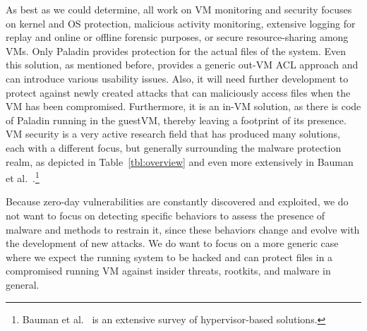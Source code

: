 \par As best as we could determine, all work on \ac{VM} monitoring and security focuses on kernel and \ac{OS} protection, malicious activity monitoring, extensive logging for replay and online or offline forensic purposes, or secure resource-sharing among \ac{VM}s. Only Paladin \cite{baliga2008automated} provides protection for the actual files of the system. Even this solution, as mentioned before, provides a generic out-\ac{VM} \ac{ACL} approach and can introduce various usability issues. Also, it will need further development to protect against newly created attacks that can maliciously access files when the \ac{VM} has been compromised. Furthermore, it is an in-\ac{VM} solution, as there is code of Paladin running in the guest\ac{VM}, thereby leaving a footprint of its presence. \ac{VM} security is a very active research field that has produced many solutions, each with a different focus, but generally surrounding the malware protection realm, as depicted in Table~\ref{tbl:overview} and even more extensively in Bauman et al.~\cite{bauman2015survey}.\footnote{Bauman et al.~\cite{bauman2015survey} is an extensive survey of hypervisor-based solutions.}


\par Because zero-day vulnerabilities are constantly discovered and exploited, we do not want to focus on detecting specific behaviors to assess the presence of malware and methods to restrain it, since these behaviors change and evolve with the development of new attacks. We do want to focus on a more generic case where we expect the running system to be hacked and can protect files in a compromised running \ac{VM} against insider threats, rootkits, and malware in general. 



